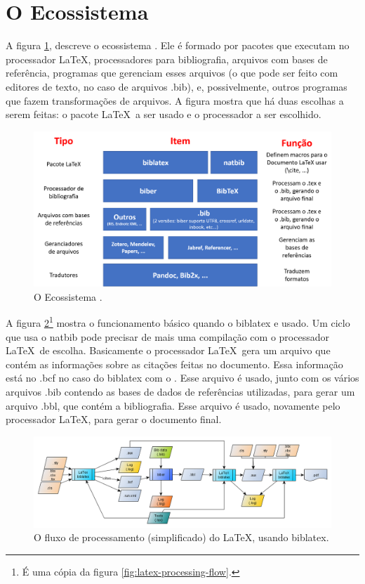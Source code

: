 
\section{O Ecossistema }


A figura \ref{fig:mundolatexport}\autocite{bibera2012}, descreve o ecossistema . Ele é formado por pacotes que executam no processador \LaTeX , processadores para bibliografia, arquivos com bases de referência, programas que gerenciam esses arquivos (o que pode ser feito com editores de texto, no caso de arquivos .bib), e, possivelmente, outros programas que fazem transformações de arquivos. A figura mostra que há duas escolhas a serem feitas: o pacote \LaTeX\  a ser usado e o processador
a ser escolhido. 

\begin{figure}[hbt]
    \centering
    \includegraphics[width=0.9\linewidth]{Images/mundolatexport}
    \caption{O Ecossistema \parencite{bibera2012}.}
    \label{fig:mundolatexport}
\end{figure}



A figura \ref{fig:latex-processing-flow2}\footnote{É uma cópia da figura \ref{fig:latex-processing-flow}.} mostra o funcionamento básico quando o biblatex e usado. Um ciclo que usa o natbib pode precisar de mais uma compilação com o processador \LaTeX\  de escolha. Basicamente o processador \LaTeX\   gera um arquivo que contém as informações sobre as citações feitas no documento. Essa informação está no .bcf no caso do biblatex com o . Esse arquivo é usado, junto com os vários arquivos .bib contendo as bases de dados de referências utilizadas, para gerar um arquivo .bbl, que contém a bibliografia. Esse arquivo é usado, novamente pelo processador \LaTeX, para gerar o documento final. 


\begin{figure}[hbt]
    \centering
    \includegraphics[width=0.8\linewidth]{"Images/LaTeX processing flow"}
    \caption{O fluxo de processamento (simplificado) do \LaTeX, usando
    biblatex.}
    \label{fig:latex-processing-flow2}
\end{figure}

